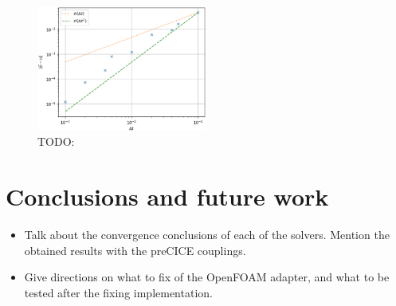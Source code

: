 \documentclass[
  english,        %
  font=times,     %
  onecolumn,      %
]{tumarticle}
\begin{document}
\begin{figure}[!ht]
    \centering
    \includegraphics[width=0.5\textwidth]{resources/fake_fluid.png}
    \caption{TODO: }
    \label{fig:fake-fluid}
\end{figure}



\section{Conclusions and future work}
\begin{itemize}
    \item Talk about the convergence conclusions of each of the solvers. Mention the obtained results with the preCICE couplings.
    \item Give directions on what to fix of the OpenFOAM adapter, and what to be tested after the fixing implementation.

\end{itemize}

\printbibliography
\end{document}
